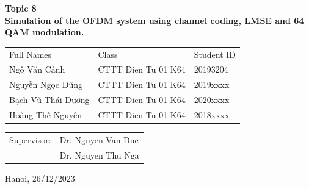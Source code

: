 \begin{center}
    \textbf{\fontsize{21pt}{0pt}\selectfont Topic 8 \\}
    \textbf{\fontsize{21pt}{0pt}\selectfont Simulation of the OFDM system using channel coding, LMSE and 64 QAM modulation. }
\vspace{7pt}
\begin{table}[H]
    \centering
    \begin{tabular}{l l l}
        Full Names          & Class                 & Student ID \\
        Ngô Văn Cảnh        & CTTT Dien Tu 01 K64   & 20193204 \\
        Nguyễn Ngọc Dũng    & CTTT Dien Tu 01 K64   & 2019xxxx \\
        Bạch Vũ Thái Dương  & CTTT Dien Tu 01 K64   & 2020xxxx \\
        Hoàng Thế Nguyên    & CTTT Dien Tu 01 K64   & 2018xxxx \\
    \end{tabular}
\end{table}
\vspace{1.5cm}
\begin{table}[H]
    \centering
    \begin{tabular}{l l}
        \fontsize{14pt}{0pt}\selectfont Supervisor: & \fontsize{14pt}{0pt}\selectfont Dr. Nguyen Van Duc \\
        {} & Dr. Nguyen Thu Nga \hspace{5pt} \\
    \end{tabular}
\end{table}
\vspace{1.5cm}
\fontsize{14pt}{0pt}\selectfont Hanoi, 26/12/2023
\end{center}

